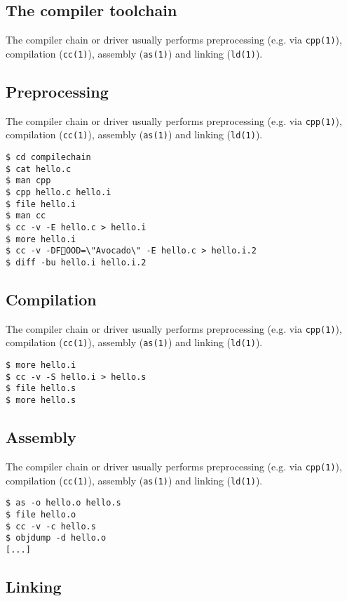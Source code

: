 \documentclass[xga]{xdvislides}
\begin{document}
\subsection{The compiler toolchain}

The compiler chain or driver usually performs
preprocessing (e.g. via {\tt cpp(1)}), compilation
({\tt cc(1)}), assembly ({\tt as(1)}) and linking
({\tt ld(1)}).

\subsection{Preprocessing}

The compiler chain or driver usually performs
preprocessing (e.g. via {\tt cpp(1)}), compilation
({\tt cc(1)}), assembly ({\tt as(1)}) and linking
({\tt ld(1)}).

\begin{verbatim}
$ cd compilechain
$ cat hello.c
$ man cpp
$ cpp hello.c hello.i
$ file hello.i
$ man cc
$ cc -v -E hello.c > hello.i
$ more hello.i
$ cc -v -DFOOD=\"Avocado\" -E hello.c > hello.i.2
$ diff -bu hello.i hello.i.2
\end{verbatim}

\subsection{Compilation}

The compiler chain or driver usually performs
preprocessing (e.g. via {\tt cpp(1)}), compilation
({\tt cc(1)}), assembly ({\tt as(1)}) and linking
({\tt ld(1)}).

\begin{verbatim}
$ more hello.i
$ cc -v -S hello.i > hello.s
$ file hello.s
$ more hello.s
\end{verbatim}

\subsection{Assembly}

The compiler chain or driver usually performs
preprocessing (e.g. via {\tt cpp(1)}), compilation
({\tt cc(1)}), assembly ({\tt as(1)}) and linking
({\tt ld(1)}).

\begin{verbatim}
$ as -o hello.o hello.s
$ file hello.o
$ cc -v -c hello.s
$ objdump -d hello.o
[...]
\end{verbatim}

\subsection{Linking}
\end{document}

